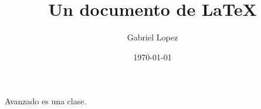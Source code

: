\documentclass{article}
\title{Un documento de \LaTeX}
\author{Gabriel Lopez}
\date{\today}
\begin{document}
\maketitle
Avanzado es una clase.
\end{document}
